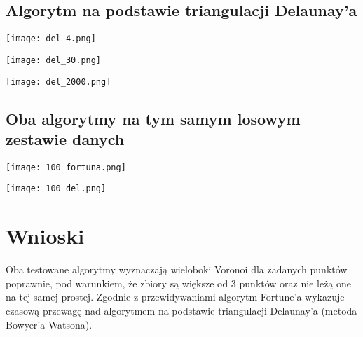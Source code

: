 \documentclass{article}
\begin{document}
\subsection{Algorytm na podstawie triangulacji Delaunay'a}
        \begin{minipackage}{\linewidth}
            \centering
            \texttt{[image: del\_4.png]}
        \end{minipackage}
        \begin{minipackage}{\linewidth}
            \centering
            \texttt{[image: del\_30.png]}
        \end{minipackage}
        \begin{minipackage}{\linewidth}
            \centering
            \texttt{[image: del\_2000.png]}
        \end{minipackage}
        
\subsection{Oba algorytmy na tym samym losowym zestawie danych}
\begin{minipackage}{\linewidth}
            \centering
            \texttt{[image: 100\_fortuna.png]}
        \end{minipackage}
        \begin{minipackage}{\linewidth}
            \centering
            \texttt{[image: 100\_del.png]}
        \end{minipackage}
        
\section{Wnioski}
Oba testowane algorytmy wyznaczają wieloboki Voronoi dla zadanych punktów poprawnie, pod warunkiem, że zbiory są większe od 3 punktów oraz nie leżą one na tej samej prostej. Zgodnie z przewidywaniami algorytm Fortune'a wykazuje czasową przewagę nad algorytmem na podstawie triangulacji Delaunay'a (metoda Bowyer'a Watsona).
\end{document}
